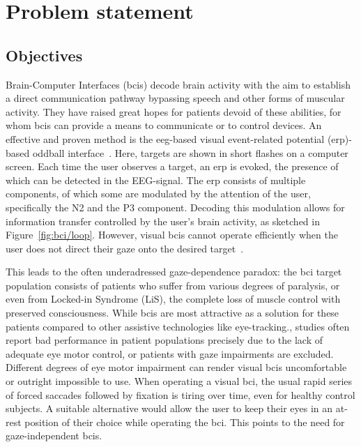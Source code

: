 
\section{Problem statement}

\subsection{Objectives}

Brain-Computer Interfaces (\ac{bci}s) decode brain activity with the aim to establish a direct communication
pathway bypassing speech and other forms of muscular activity. They have raised great hopes for patients
devoid of these abilities, for whom \ac{bci}s can provide a means to communicate or to
control devices.
An effective and proven method is the \ac{eeg}-based visual event-related potential (\ac{erp})-based
oddball interface~\cite{Wolpaw2018,Severens2020}.
Here, targets are shown in short flashes on a computer screen.
Each time the user observes a target, an \ac{erp} is evoked, the presence of which can be
detected in the EEG-signal.
The \ac{erp} consists of multiple components, of which some are modulated by the
attention of the user, specifically the N2 and the P3 component.
Decoding this modulation allows for information transfer controlled by the
user's brain activity, as sketched in Figure~\ref{fig:bci/loop}.
However, visual \ac{bci}s cannot operate efficiently when the user does not direct
their gaze onto the desired target~\cite{Brunner2010, Frenzel2011}.

This leads to the often underadressed gaze-dependence paradox: the \ac{bci} target
population consists of patients who suffer from various degrees
of paralysis, or even from Locked-in Syndrome (LiS), the complete loss of muscle
control with preserved consciousness.
While \ac{bci}s are most attractive as a solution for these patients
compared to other assistive technologies like eye-tracking., studies often
report bad performance in patient populations precisely due to the lack of adequate eye motor
control, or patients with gaze impairments are excluded.
Different degrees of eye motor impairment can render visual \ac{bci}s
uncomfortable or outright impossible to use.
When operating a visual \ac{bci}, the usual rapid series of forced saccades followed
by fixation is tiring over time, even for healthy control subjects.
A suitable alternative would allow the user to keep their eyes in an at-rest
position of their choice while operating the \ac{bci}.
This points to the need for gaze-independent \ac{bci}s.

